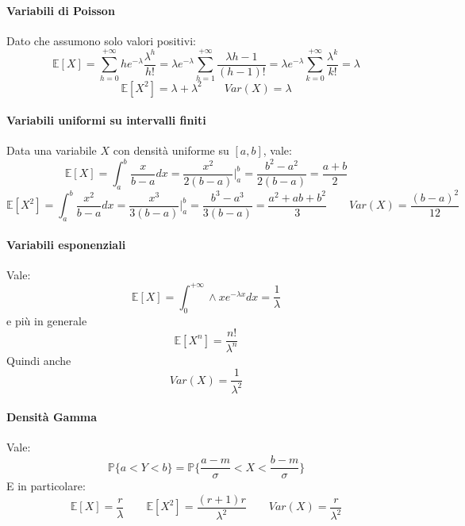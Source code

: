 \paragraph{Variabili di Poisson}
Dato che assumono solo valori positivi:
\begin{equation}
	\mathbb{E}[X] = \sum_{h=0}^{+\infty}he^{-\lambda}\frac{\lambda^h}{h!} = \lambda e^{-\lambda}\sum_{h=1}^{+\infty}\frac{\lambda{h-1}}{(h-1)!} = \lambda e^{-\lambda}\sum_{k=0}^{+\infty}\frac{\lambda^k}{k!}=\lambda
\end{equation}
\begin{equation}
	\mathbb{E}[X^2]=\lambda + \lambda^2 \quad\quad Var(X)=\lambda
\end{equation}

\paragraph{Variabili uniformi su intervalli finiti}
Data una variabile $X$ con densità uniforme su $[a,b]$, vale:
\begin{equation}
	\mathbb{E}[X] = \int_{a}^{b}\frac{x}{b-a}dx = \frac{x^2}{2(b-a)}\bigg\vert^b_a = \frac{b^2-a^2}{2(b-a)}=\frac{a+b}{2}
\end{equation}
\begin{equation}
	\mathbb{E}[X^2] = \int_{a}^{b}\frac{x^2}{b-a}dx = \frac{x^3}{3(b-a)}\bigg\vert^b_a = \frac{b^3-a^3}{3(b-a)}=\frac{a^2+ab+b^2}{3} \quad\quad Var(X) = \frac{(b-a)^2}{12}
\end{equation}

\paragraph{Variabili esponenziali}
Vale:
\begin{equation}
	\mathbb{E}[X] = \int_{0}^{+\infty}\land x e^{-\lambda x}dx=\frac{1}{\lambda}
\end{equation}
e più in generale
\begin{equation}
	\mathbb{E}[X^n]=\frac{n!}{\lambda^n}
\end{equation}
Quindi anche
\begin{equation}
	Var(X) = \frac{1}{\lambda^2}
\end{equation}

\paragraph{Densità Gamma}
Vale:
\begin{equation}
	\mathbb{P}\{a < Y < b\} = \mathbb{P}\bigg\{\frac{a-m}{\sigma} < X < \frac{b-m}{\sigma}\bigg\}
\end{equation}
E in particolare:
\begin{equation}
	\mathbb{E}[X] = \frac{r}{\lambda} \quad\quad \mathbb{E}[X^2] = \frac{(r+1)r}{\lambda^2} \quad\quad Var(X)=\frac{r}{\lambda^2}
\end{equation}

